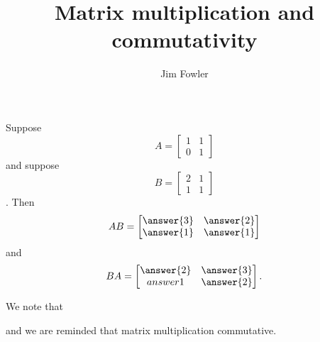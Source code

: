 \documentclass{ximera}
\title{Matrix multiplication and commutativity}
\author{Jim Fowler}
\begin{document}
\begin{problem}
Suppose
\[
  A = \begin{bmatrix}
    1 & 1 \\
    0 & 1
  \end{bmatrix}
\]
and suppose
\[
  B = \begin{bmatrix}
    2 & 1 \\
    1 & 1
  \end{bmatrix}  
\].
Then
\[
  AB =
  \begin{bmatrix}
    \answer{3} & \answer{2} \\
    \answer{1} & \answer{1}
  \end{bmatrix}
\]
and
\[
  BA = \begin{bmatrix}
    \answer{2} & \answer{3} \\
    answer{1} & \answer{2}
  \end{bmatrix}.
\]

\begin{problem}
  We note that
  \begin{multipleChoice}
  \end{multipleChoice}
  and we are reminded that matrix multiplication
   commutative.
\end{problem}
\end{problem}
\end{document}
